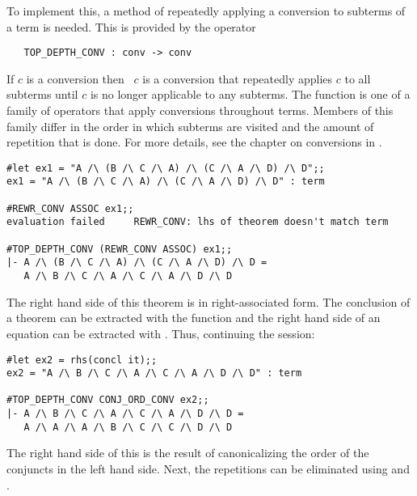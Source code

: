 To implement this, a method of repeatedly applying a conversion to
subterms of a term is needed. This is provided by the operator

\begin{hol}\begin{verbatim}
   TOP_DEPTH_CONV : conv -> conv
\end{verbatim}\end{hol}

\noindent If $c$ is a conversion then ~$c$ is a
conversion that repeatedly applies $c$ to all subterms until $c$ is no
longer applicable to any subterms. The function 
is one of a family of operators that apply conversions throughout 
terms. Members of this family differ in the order in which subterms
are visited and the amount of repetition that is done. For more
details, see the chapter on conversions in \DESCRIPTION.

\begin{session}\begin{verbatim}
#let ex1 = "A /\ (B /\ C /\ A) /\ (C /\ A /\ D) /\ D";;
ex1 = "A /\ (B /\ C /\ A) /\ (C /\ A /\ D) /\ D" : term

#REWR_CONV ASSOC ex1;;
evaluation failed     REWR_CONV: lhs of theorem doesn't match term

#TOP_DEPTH_CONV (REWR_CONV ASSOC) ex1;;
|- A /\ (B /\ C /\ A) /\ (C /\ A /\ D) /\ D =
   A /\ B /\ C /\ A /\ C /\ A /\ D /\ D
\end{verbatim}\end{session}

\noindent The right hand side of this theorem is  in right-associated
form. The conclusion of a theorem can be extracted with the \ML{} function
 and the right hand side of an equation can be extracted with
. Thus, continuing the session:

\begin{session}\begin{verbatim}
#let ex2 = rhs(concl it);;
ex2 = "A /\ B /\ C /\ A /\ C /\ A /\ D /\ D" : term

#TOP_DEPTH_CONV CONJ_ORD_CONV ex2;;
|- A /\ B /\ C /\ A /\ C /\ A /\ D /\ D =
   A /\ A /\ A /\ B /\ C /\ C /\ D /\ D
\end{verbatim}\end{session}

\noindent The right hand side of this is the result of canonicalizing
the order of the conjuncts in the left hand side. Next, the repetitions
can be eliminated using  and .

